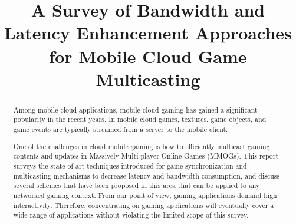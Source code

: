 \documentclass[conference]{IEEEtran}
\begin{document}
\title{A Survey of Bandwidth and Latency Enhancement Approaches for Mobile Cloud Game Multicasting}

\author{
}




\maketitle
\begin{abstract}
Among mobile cloud applications, mobile cloud gaming has gained a significant popularity in the recent years. In mobile cloud games, textures, game objects, and game events are typically streamed from a server to the mobile client.

One of the challenges in cloud mobile gaming is how to efficiently multicast gaming contents and updates in Massively Multi-player Online Games (MMOGs). This report surveys the state of art techniques introduced for game synchronization and multicasting mechanisms to decrease latency and bandwidth consumption, and discuss several schemes that have been proposed in this area that can be applied to any networked gaming context. From our point of view, gaming applications demand high interactivity. Therefore, concentrating on gaming applications will eventually cover a wide range of applications without violating the limited scope of this survey.
\end{abstract}
\IEEEpeerreviewmaketitle
\end{document}
